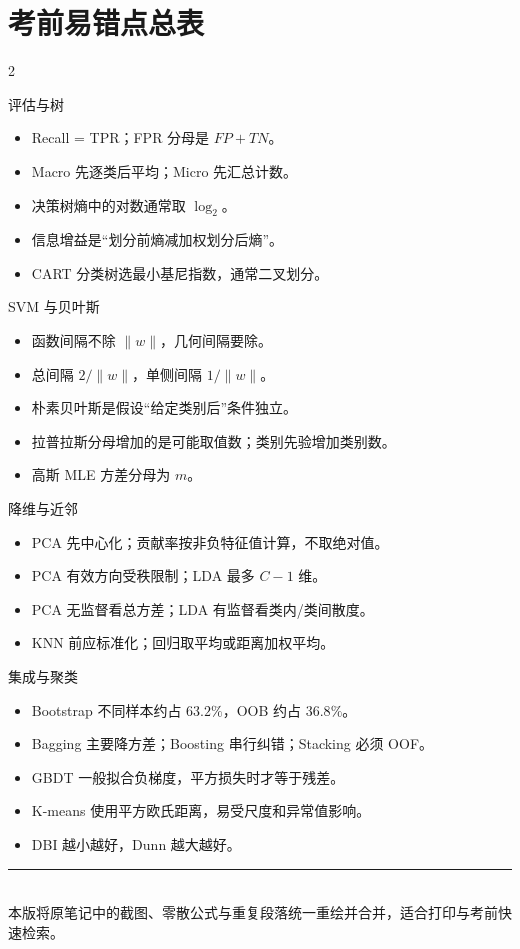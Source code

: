 \documentclass[9pt,a4paper,UTF8]{ctexart}
\begin{document}
\section{考前易错点总表}
\begin{multicols}{2}
\begin{warnbox}{评估与树}
\begin{itemize}
\item Recall = TPR；FPR 分母是 $FP+TN$。
\item Macro 先逐类后平均；Micro 先汇总计数。
\item 决策树熵中的对数通常取 $\log_2$。
\item 信息增益是“划分前熵减加权划分后熵”。
\item CART 分类树选最小基尼指数，通常二叉划分。
\end{itemize}
\end{warnbox}
\begin{warnbox}{SVM 与贝叶斯}
\begin{itemize}
\item 函数间隔不除 $\|w\|$，几何间隔要除。
\item 总间隔 $2/\|w\|$，单侧间隔 $1/\|w\|$。
\item 朴素贝叶斯是假设“给定类别后”条件独立。
\item 拉普拉斯分母增加的是可能取值数；类别先验增加类别数。
\item 高斯 MLE 方差分母为 $m$。
\end{itemize}
\end{warnbox}
\begin{warnbox}{降维与近邻}
\begin{itemize}
\item PCA 先中心化；贡献率按非负特征值计算，不取绝对值。
\item PCA 有效方向受秩限制；LDA 最多 $C-1$ 维。
\item PCA 无监督看总方差；LDA 有监督看类内/类间散度。
\item KNN 前应标准化；回归取平均或距离加权平均。
\end{itemize}
\end{warnbox}
\begin{warnbox}{集成与聚类}
\begin{itemize}
\item Bootstrap 不同样本约占 $63.2\%$，OOB 约占 $36.8\%$。
\item Bagging 主要降方差；Boosting 串行纠错；Stacking 必须 OOF。
\item GBDT 一般拟合负梯度，平方损失时才等于残差。
\item K-means 使用平方欧氏距离，易受尺度和异常值影响。
\item DBI 越小越好，Dunn 越大越好。
\end{itemize}
\end{warnbox}
\end{multicols}

\vfill
\begin{center}
\color{teal}\rule{0.55\textwidth}{0.5pt}\\[2mm]
\small 本版将原笔记中的截图、零散公式与重复段落统一重绘并合并，适合打印与考前快速检索。
\end{center}
\end{document}
